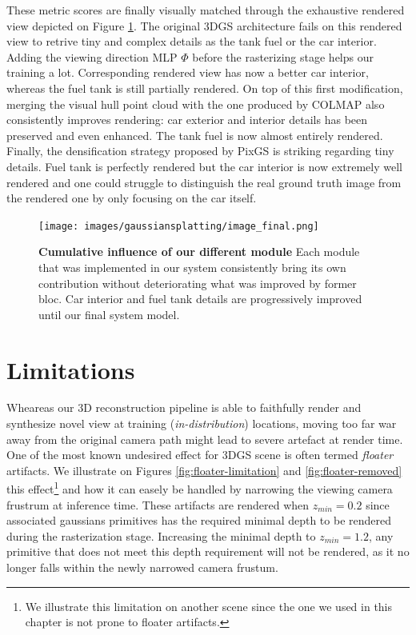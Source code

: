 These metric scores are finally visually matched through the exhaustive rendered view depicted on Figure \ref{fig:gs-vh-result}. The original 3D\ac{GS} architecture fails on this rendered view to retrive tiny and complex details as the tank fuel or the car interior. Adding the viewing direction \ac{MLP} $\Phi$ before the rasterizing stage helps our training a lot. Corresponding rendered view has now a better car interior, whereas the fuel tank is still partially rendered. On top of this first modification, merging the visual hull point cloud with the one produced by COLMAP also consistently improves rendering: car exterior and interior details has been preserved and even enhanced. The tank fuel is now almost entirely rendered. Finally, the densification strategy proposed by PixGS is striking regarding tiny details. Fuel tank is perfectly rendered but the car interior is now extremely well rendered and one could struggle to distinguish the real ground truth image from the rendered one by only focusing on the car itself.   

\begin{figure}[htb!]
  \center
\texttt{[image: images/gaussiansplatting/image\_final.png]}
\caption{\textbf{Cumulative influence of our different module} Each module that was implemented in our system consistently bring its own contribution without deteriorating what was improved by former bloc. Car interior and fuel tank details are progressively improved until our final system model.}
\label{fig:gs-vh-result}
\end{figure}

\section{Limitations}
\label{sec:gs-limitation}

Wheareas our 3D reconstruction pipeline is able to faithfully render and synthesize novel view at training (\textit{in-distribution}) locations, moving too far war away from the original camera path might lead to severe artefact at render time. One of the most known undesired effect for 3D\ac{GS} scene is often termed \textit{floater} artifacts. We illustrate on Figures \ref{fig:floater-limitation} and \ref{fig:floater-removed} this effect\footnote{We illustrate this limitation on another scene since the one we used in this chapter is not prone to floater artifacts.} and how it can easely be handled by narrowing the viewing camera frustrum at inference time. These artifacts are rendered when $z_{min}=0.2$ since associated gaussians primitives has the required minimal depth to be rendered during the rasterization stage. Increasing the minimal depth to $z_{min}=1.2$, any primitive that does not meet this depth requirement will not be rendered, as it no longer falls within the newly narrowed camera frustum.


